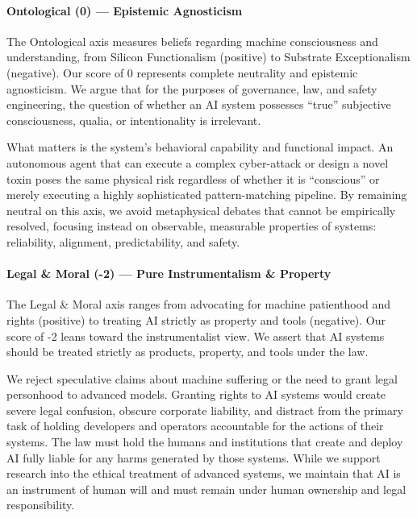 \paragraph{Ontological (0) --- Epistemic
Agnosticism}\label{ontological-0-epistemic-agnosticism}

The Ontological axis measures beliefs regarding machine consciousness
and understanding, from Silicon Functionalism (positive) to Substrate
Exceptionalism (negative). Our score of 0 represents complete neutrality
and epistemic agnosticism. We argue that for the purposes of governance,
law, and safety engineering, the question of whether an AI system
possesses ``true'' subjective consciousness, qualia, or intentionality
is irrelevant.

What matters is the system's behavioral capability and functional
impact. An autonomous agent that can execute a complex cyber-attack or
design a novel toxin poses the same physical risk regardless of whether
it is ``conscious'' or merely executing a highly sophisticated
pattern-matching pipeline. By remaining neutral on this axis, we avoid
metaphysical debates that cannot be empirically resolved, focusing
instead on observable, measurable properties of systems: reliability,
alignment, predictability, and safety.

\paragraph{Legal \& Moral (-2) --- Pure Instrumentalism \&
Property}\label{legal-moral--2-pure-instrumentalism-property}

The Legal \& Moral axis ranges from advocating for machine patienthood
and rights (positive) to treating AI strictly as property and tools
(negative). Our score of -2 leans toward the instrumentalist view. We
assert that AI systems should be treated strictly as products, property,
and tools under the law.

We reject speculative claims about machine suffering or the need to
grant legal personhood to advanced models. Granting rights to AI systems
would create severe legal confusion, obscure corporate liability, and
distract from the primary task of holding developers and operators
accountable for the actions of their systems. The law must hold the
humans and institutions that create and deploy AI fully liable for any
harms generated by those systems. While we support research into the
ethical treatment of advanced systems, we maintain that AI is an
instrument of human will and must remain under human ownership and legal
responsibility.

